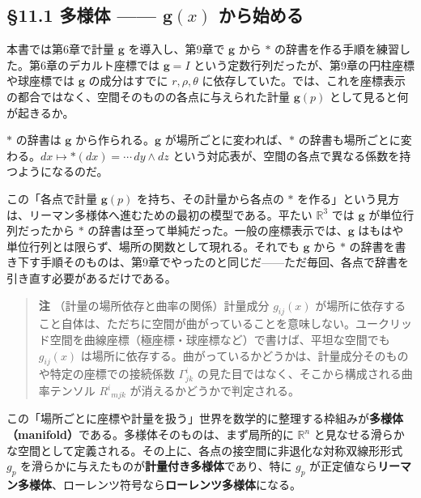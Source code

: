 \documentclass[a4paper,12pt,openany]{book}
\begin{document}
\hypertarget{ux591aux69d8ux4f53-mathbfgx-ux304bux3089ux59cbux3081ux308b}{%
\subsection{\texorpdfstring{§11.1 多様体 —— \(\mathbf{g}(x)\)
から始める}{§11.1 多様体 —— \textbackslash mathbf\{g\}(x) から始める}}\label{ux591aux69d8ux4f53-mathbfgx-ux304bux3089ux59cbux3081ux308b}}

本書では第6章で計量 \(\mathbf{g}\) を導入し、第9章で \(\mathbf{g}\) から
\(\ast\) の辞書を作る手順を練習した。第6章のデカルト座標では
\(\mathbf{g}=I\) という定数行列だったが、第9章の円柱座標や球座標では
\(\mathbf{g}\) の成分はすでに \(r,\rho,\theta\)
に依存していた。では、これを座標表示の都合ではなく、空間そのものの各点に与えられた計量
\(\mathbf{g}(p)\) として見ると何が起きるか。

\(\ast\) の辞書は \(\mathbf{g}\) から作られる。\(\mathbf{g}\)
が場所ごとに変われば、\(\ast\)
の辞書も場所ごとに変わる。\(dx \mapsto \ast(dx) = \cdots\,dy\wedge dz\)
という対応表が、空間の各点で異なる係数を持つようになるのだ。

この「各点で計量 \(\mathbf{g}(p)\) を持ち、その計量から各点の \(\ast\)
を作る」という見方は、リーマン多様体へ進むための最初の模型である。平たい
\(\mathbb{R}^3\) では \(\mathbf{g}\) が単位行列だったから \(\ast\)
の辞書は至って単純だった。一般の座標表示では、\(\mathbf{g}\)
はもはや単位行列とは限らず、場所の関数として現れる。それでも
\(\mathbf{g}\) から \(\ast\)
の辞書を書き下す手順そのものは、第9章でやったのと同じだ——ただ毎回、各点で辞書を引き直す必要があるだけである。

\begin{quote}
\textbf{注} （計量の場所依存と曲率の関係）計量成分 \(g_{ij}(x)\)
が場所に依存すること自体は、ただちに空間が曲がっていることを意味しない。ユークリッド空間を曲線座標（極座標・球座標など）で書けば、平坦な空間でも
\(g_{ij}(x)\)
は場所に依存する。曲がっているかどうかは、計量成分そのものや特定の座標での接続係数
\(\Gamma^i_{jk}\) の見た目ではなく、そこから構成される曲率テンソル
\(R^i{}_{mjk}\) が消えるかどうかで判定される。
\end{quote}

この「場所ごとに座標や計量を扱う」世界を数学的に整理する枠組みが\textbf{多様体（manifold）}である。多様体そのものは、まず局所的に
\(\mathbb{R}^n\)
と見なせる滑らかな空間として定義される。その上に、各点の接空間に非退化な対称双線形形式
\(g_p\) を滑らかに与えたものが\textbf{計量付き多様体}であり、特に
\(g_p\)
が正定値なら\textbf{リーマン多様体}、ローレンツ符号なら\textbf{ローレンツ多様体}になる。
\end{document}
